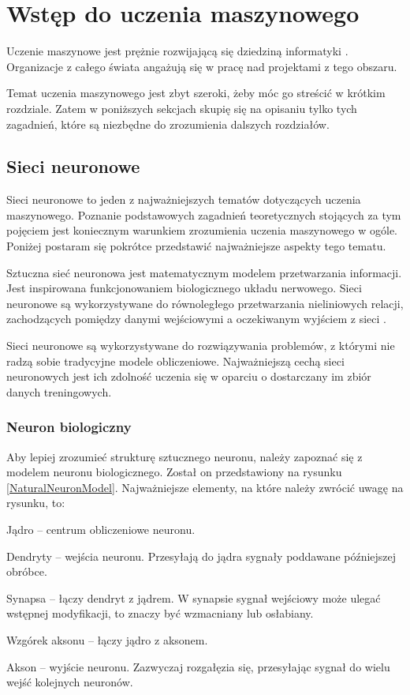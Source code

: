 \chapter{Wstęp do uczenia maszynowego}
Uczenie maszynowe jest prężnie rozwijającą się dziedziną informatyki \cite{machineLearning:market}. Organizacje z całego świata angażują się w pracę nad projektami z tego obszaru.

Temat uczenia maszynowego jest zbyt szeroki, żeby móc go streścić w krótkim rozdziale. Zatem w poniższych sekcjach skupię się na opisaniu tylko tych zagadnień, które są niezbędne do zrozumienia dalszych rozdziałów.

\section{Sieci neuronowe}
Sieci neuronowe to jeden z najważniejszych tematów dotyczących uczenia maszynowego. Poznanie podstawowych zagadnień teoretycznych stojących za tym pojęciem jest koniecznym warunkiem zrozumienia uczenia maszynowego w ogóle. Poniżej postaram się pokrótce przedstawić najważniejsze aspekty tego tematu.

Sztuczna sieć neuronowa jest matematycznym modelem przetwarzania informacji. Jest inspirowana funkcjonowaniem biologicznego układu nerwowego. Sieci neuronowe są wykorzystywane do równoległego przetwarzania nieliniowych relacji, zachodzących pomiędzy danymi wejściowymi a oczekiwanym wyjściem z sieci \cite{neuralNetworks:introduction}.

Sieci neuronowe są wykorzystywane do rozwiązywania problemów, z którymi nie radzą sobie tradycyjne modele obliczeniowe. Najważniejszą cechą sieci neuronowych jest ich zdolność uczenia się w oparciu o dostarczany im zbiór danych treningowych.

\subsection{Neuron biologiczny}
Aby lepiej zrozumieć strukturę sztucznego neuronu, należy zapoznać się z modelem neuronu biologicznego. Został on przedstawiony na rysunku \ref{NaturalNeuronModel}. Najważniejsze elementy, na które należy zwrócić uwagę na rysunku, to:
\begin{itemize*}
\item Jądro -- centrum obliczeniowe neuronu.
\item Dendryty -- wejścia neuronu. Przesyłają do jądra sygnały poddawane późniejszej obróbce.
\item Synapsa -- łączy dendryt z jądrem. W synapsie sygnał wejściowy może ulegać wstępnej modyfikacji, to znaczy być wzmacniany lub osłabiany.
\item Wzgórek aksonu -- łączy jądro z aksonem.
\item Akson -- wyjście neuronu. Zazwyczaj rozgałęzia się, przesyłając sygnał do wielu wejść kolejnych neuronów.
\end{itemize*}


